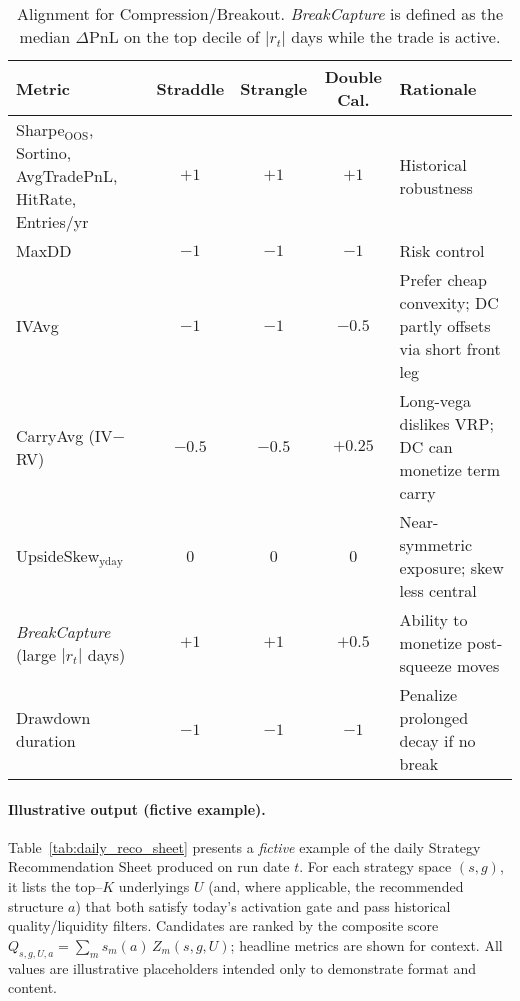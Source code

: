 \documentclass[12pt,a4paper]{report}
\begin{document}
\begin{table}[h]
\centering
\begin{tabular}{lccc p{6.9cm}}
\toprule
\textbf{Metric} & \textbf{Straddle} & \textbf{Strangle} & \textbf{Double Cal.} & \textbf{Rationale} \\
\midrule
Sharpe$_{\text{OOS}}$, Sortino, AvgTradePnL, HitRate, Entries/yr & $+1$ & $+1$ & $+1$ & Historical robustness \\
MaxDD & $-1$ & $-1$ & $-1$ & Risk control \\
IVAvg & $-1$ & $-1$ & $-0.5$ & Prefer cheap convexity; DC partly offsets via short front leg \\
CarryAvg (IV$-$RV) & $-0.5$ & $-0.5$ & $+0.25$ & Long-vega dislikes VRP; DC can monetize term carry \\
UpsideSkew$_{\text{yday}}$ & $0$ & $0$ & $0$ & Near-symmetric exposure; skew less central \\
\emph{BreakCapture} (large $|r_t|$ days) & $+1$ & $+1$ & $+0.5$ & Ability to monetize post-squeeze moves \\
Drawdown duration & $-1$ & $-1$ & $-1$ & Penalize prolonged decay if no break \\
\bottomrule
\end{tabular}
\caption{Alignment for Compression/Breakout. \emph{BreakCapture} is defined as the median $\Delta\mathrm{PnL}$ on the top decile of $|r_t|$ days while the trade is active.}
\label{tab:align-compression}
\end{table}

\paragraph{Illustrative output (fictive example).}
Table~\ref{tab:daily_reco_sheet} presents a \emph{fictive} example of the daily Strategy Recommendation Sheet produced on run date $t$. For each strategy space $(s,g)$, it lists the top--$K$ underlyings $U$ (and, where applicable, the recommended structure $a$) that both satisfy today’s activation gate and pass historical quality/liquidity filters. Candidates are ranked by the composite score $Q_{s,g,U,a}=\sum_m s_m(a)\,Z_m(s,g,U)$; headline metrics are shown for context. All values are illustrative placeholders intended only to demonstrate format and content.
\end{document}
